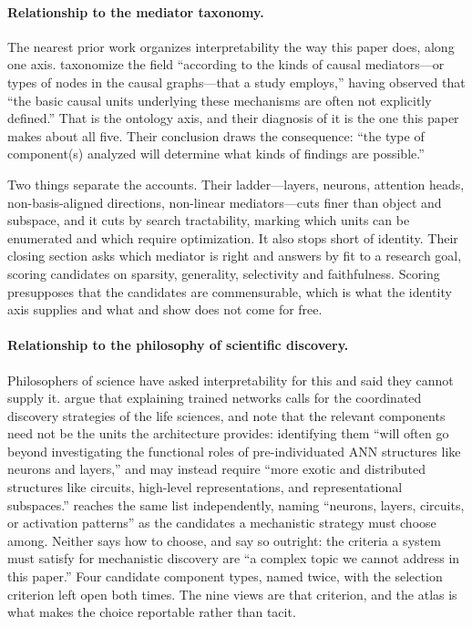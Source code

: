 \documentclass{article}
\begin{document}
\paragraph{Relationship to the mediator taxonomy.}
The nearest prior work organizes interpretability the way this paper
does, along one axis.  \citet{mueller2025mediator} taxonomize the field
``according to the kinds of causal mediators---or types of nodes in the
causal graphs---that a study employs,'' having observed that ``the basic
causal units underlying these mechanisms are often not explicitly
defined.''  That is the ontology axis, and their diagnosis of it is the
one this paper makes about all five.  Their conclusion draws the
consequence: ``the type of component(s) analyzed will determine what
kinds of findings are possible.''

Two things separate the accounts.  Their ladder---layers, neurons,
attention heads, non-basis-aligned directions, non-linear
mediators---cuts finer than object and subspace, and it cuts by search
tractability, marking which units can be enumerated and which require
optimization.  It also stops short of identity.  Their closing section
asks which mediator is right and answers by fit to a research goal,
scoring candidates on sparsity, generality, selectivity and
faithfulness.  Scoring presupposes that the candidates are commensurable,
which is what the identity axis supplies and what \citet{meloux2025} and
\citet{chen2026} show does not come for free.

\paragraph{Relationship to the philosophy of scientific discovery.}
Philosophers of science have asked interpretability for this and said
they cannot supply it.  \citet{kastner2024} argue that explaining trained
networks calls for the coordinated discovery strategies of the life
sciences, and note that the relevant components need not be the units the
architecture provides: identifying them ``will often go beyond
investigating the functional roles of pre-individuated {ANN} structures
like neurons and layers,'' and may instead require ``more exotic and
distributed structures like circuits, high-level representations, and
representational subspaces.''  \citet{rabiza2025} reaches the same list
independently, naming ``neurons, layers, circuits, or activation
patterns'' as the candidates a mechanistic strategy must choose among.
Neither says how to choose, and \citeauthor{kastner2024} say so outright:
the criteria a system must satisfy for mechanistic discovery are ``a
complex topic we cannot address in this paper.''  Four candidate
component types, named twice, with the selection criterion left open both
times.  The nine views are that criterion, and the atlas is what makes
the choice reportable rather than tacit.
\end{document}
